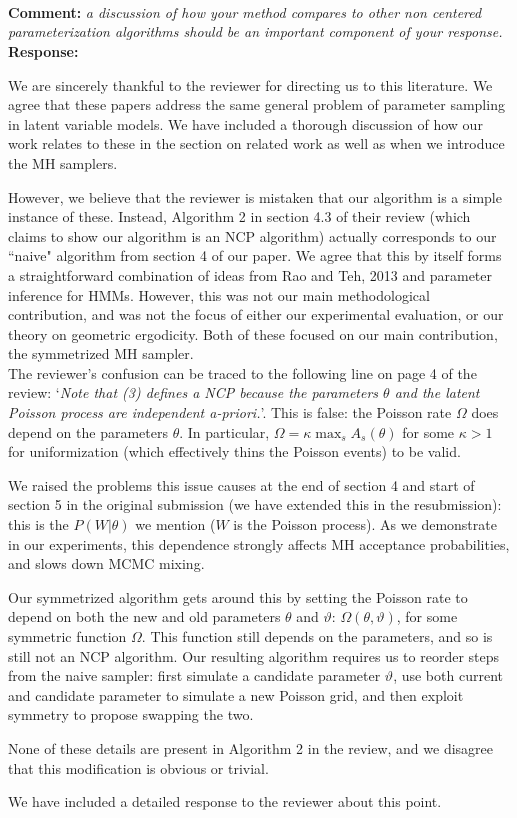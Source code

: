 \documentclass[11pt]{article}
\newcommand{\rev}[1]{\textbf{Comment: }\emph{#1}}
\newcommand{\resp}{\textbf{Response: }}
\begin{document}
~\\
~\\
~\\
\rev{a discussion of how your method compares to other non centered parameterization algorithms should be an important component of your response.} \\ 
\resp{We are sincerely thankful to the reviewer for directing us to this literature. 
  We agree that these papers address the same general problem of parameter sampling in latent variable models. 
We have included a thorough discussion of how our work relates to these in the section on related work as well as when we introduce the MH samplers. %

However, we believe that the reviewer is mistaken that our algorithm is a simple instance of these. 
Instead, Algorithm 2 in section 4.3 of their review (which claims to show our algorithm is an NCP algorithm) actually corresponds to our ``naive" algorithm from section 4 of our paper. 
We agree that this by itself forms a straightforward combination of ideas from Rao and Teh, 2013 and parameter inference for HMMs. However, this was not our main methodological contribution, and was not the focus of either our experimental evaluation, or our theory on geometric ergodicity. Both of these focused on our main contribution, the symmetrized MH sampler. 
~\\

The reviewer's confusion can be traced to the following line on page 4 of the review: `{\em Note that (3) defines a NCP because the parameters $\theta$ and the latent Poisson process are independent a-priori.}'. 
This is false: the Poisson rate $\Omega$ does depend on the parameters $\theta$. In particular, $\Omega = \kappa \max_s A_s(\theta)$ for some $\kappa > 1$ for uniformization (which effectively thins the Poisson events) to be valid. 

We raised the problems this issue causes at the end of section 4 and start of section 5 in the original submission (we have extended this in the resubmission):
this is the $P(W|\theta)$ we mention ($W$ is the Poisson process). 
As we demonstrate in our experiments, this dependence strongly affects MH acceptance probabilities, and slows down MCMC mixing. 

Our symmetrized algorithm gets around this by setting the Poisson rate to depend on both the new and old parameters $\theta$ and $\vartheta$: $\Omega(\theta,\vartheta)$, for some symmetric function $\Omega$. This function still depends on the parameters, and so is still not an NCP algorithm. Our resulting algorithm requires us to reorder steps from the naive sampler: first simulate a candidate parameter $\vartheta$, use both current and candidate parameter to simulate a new Poisson grid, and then exploit symmetry to propose swapping the two.

None of these details are present in Algorithm 2 in the review, and we disagree that this modification is obvious or trivial. 

We have included a detailed response to the reviewer about this point.

}
\end{document}
